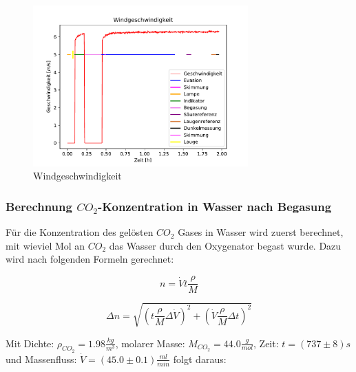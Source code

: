 \documentclass[12pt]{article}
\begin{document}
\begin{figure}[H]
	\centering
	\parbox{82.5mm}{
		\centering
		\includegraphics[width=82.5mm]{Meerwasser/Windgeschwindigkeit}
		\caption{Windgeschwindigkeit}
	}
	\hfill%
	\parbox{82.5mm}{
		\centering
	}
\end{figure}


\subsubsection{Berechnung $CO_2$-Konzentration in Wasser nach Begasung}

Für die Konzentration des gelösten $CO_2$ Gases in Wasser wird zuerst berechnet, mit wieviel Mol an $CO_2$ das Wasser durch den Oxygenator begast wurde. Dazu wird nach folgenden Formeln gerechnet:

\begin{equation}
n = \dot V t \frac{\rho}{M} 
\end{equation}

\begin{equation}
\Delta n = \sqrt{(t \frac{\rho}{M} \Delta \dot V)^{2}+(\dot V \frac{\rho}{M} \Delta t)^{2}}
\end{equation}

Mit Dichte: $\rho_{CO_2} = 1.98 \frac{kg}{m^3} $, molarer Masse: $M_{CO_2} = 44.0\frac{g}{mol} $, Zeit:  $t = (737 \pm 8)s$ und Massenfluss: $\dot V = (45.0 \pm 0.1)\frac{ml}{min}$ folgt daraus:
\end{document}
